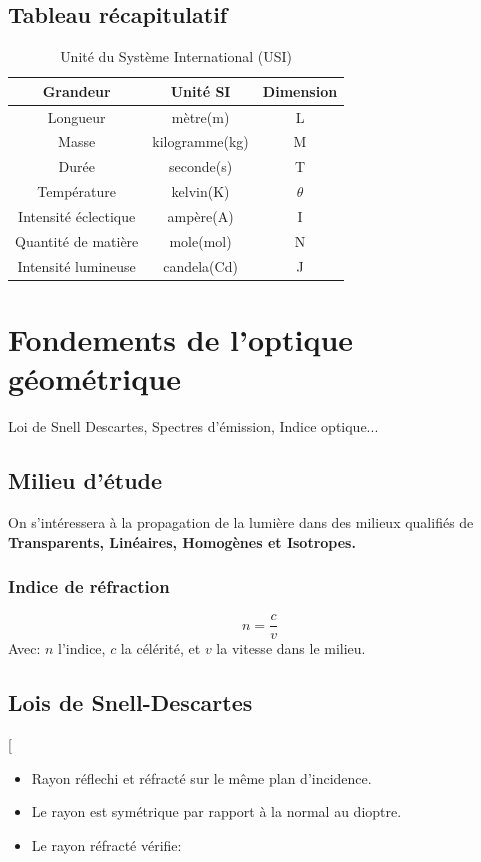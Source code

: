 \documentclass[12pt,hidelinks]{article}
\begin{document}
	\subsection{Tableau récapitulatif}
			\begin{table}[h!]
            \centering
            \begin{tabular}{c|c|c}
            Grandeur & Unité SI & Dimension \\\hline
            Longueur & mètre(m) & L  \\
            Masse & kilogramme(kg) & M  \\
            Durée & seconde(s) & T  \\
            Température & kelvin(K) & $\theta$ \\
            Intensité éclectique & ampère(A) & I \\
            Quantité de matière & mole(mol) & N\\
            Intensité lumineuse & candela(Cd) & J
            \end{tabular}
            \caption{\label{tab:table1}Unité du Système International (USI)}
            \label{table:1}
            \end{table}
\newpage
\section{Fondements de l'optique géométrique}
\vspace{3cm}
    Loi de Snell Descartes, Spectres d’émission, Indice optique...
    \subsection{Milieu d'étude} 
         On s’intéressera à la propagation de la lumière dans des milieux qualifiés de \textbf{Transparents, Linéaires, Homogènes et Isotropes.}
         \subsubsection{Indice de réfraction}
            \[n=\frac{c}{v}\]
            Avec: $n$ l'indice, $c$ la célérité, et $v$ la vitesse dans le milieu.
    \subsection{Lois de Snell-Descartes}
        \begin{DashedDefinition}{}[
        \begin{itemize}
            \item Rayon réflechi et réfracté sur le même plan d'incidence.
            \item Le rayon est symétrique par rapport à la normal au dioptre.
            \item Le rayon réfracté vérifie: 
        \end{itemize}
        \end{DashedDefinition}
\newpage
\end{document}
